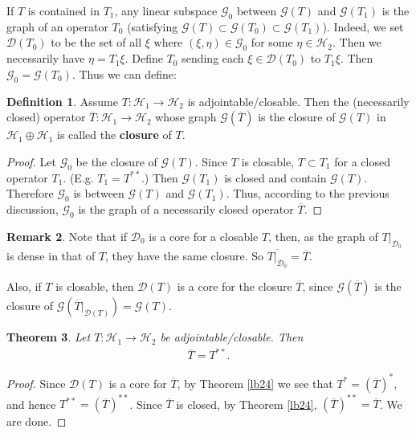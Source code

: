\documentclass[12pt,b5paper,notitlepage]{article}
\theoremstyle{definition}
\newtheorem{df}{Definition}[section]
\newtheorem{rem}[df]{Remark}
\theoremstyle{plain}
\newtheorem{thm}[df]{Theorem}
\newcommand{\mc}{\mathcal}
\newcommand{\ovl}{\overline}
\newcommand{\Dom}{\scr D}
\newcommand{\scr}{\mathscr}
\numberwithin{equation}{section}
\begin{document}
If $T$ is contained in  $T_1$, any linear subspace $\scr G_0$  between $\scr G(T)$ and $\scr G(T_1)$ is the graph of an operator $T_0$ (satisfying $\scr G(T)\subset\scr G(T_0)\subset \scr G(T_1)$). Indeed, we set $\Dom(T_0)$ to be the set of all $\xi$ where $(\xi,\eta)\in\scr G_0$ for some $\eta\in\mc H_2$. Then we necessarily have $\eta=T_1\xi$. Define $T_0$ sending each $\xi\in\Dom(T_0)$ to $T_1\xi$. Then $\scr G_0=\scr G(T_0)$. Thus we can define:

\begin{df}
Assume $T:\mc H_1\rightarrow\mc H_2$ is adjointable/closable. Then the (necessarily closed) operator $\ovl T:\mc H_1\rightarrow\mc H_2$ \index{T@$\ovl T=T^{**}$} whose graph $\scr G(\ovl T)$ is the closure of $\scr G(T)$ in $\mc H_1\oplus \mc H_1$ is called the \textbf{closure} of $T$.
\end{df} 

\begin{proof}
Let $\scr G_0$ be the closure of $\scr G(T)$. Since $T$ is closable, $T\subset T_1$ for a closed operator $T_1$. (E.g. $T_1=T^{**}$.) Then $\scr G(T_1)$ is closed and contain $\scr G(T)$. Therefore $\scr G_0$ is between $\scr G(T)$ and $\scr G(T_1)$. Thus, according to the previous discussion, $\scr G_0$ is the graph of a necessarily closed operator $\ovl T$.
\end{proof}


\begin{rem}
Note that if $\scr D_0$ is a core for a closable $T$, then, as the graph of $T|_{\scr D_0}$ is dense in that of $T$, they have the same closure. So $\ovl{T|_{\scr D_0}}=\ovl T$. 

Also, if $T$ is closable, then $\Dom(T)$ is a core for the closure $\ovl T$, since $\scr G(\ovl T)$ is the closure of $\scr G(\ovl T|_{\Dom(T)})=\scr G(T)$.
\end{rem}


\begin{thm}
Let $T:\mc H_1\rightarrow\mc H_2$ be adjointable/closable. Then
\begin{align*}
\ovl T=T^{**}.	
\end{align*}
\end{thm}

\begin{proof}
Since $\Dom(T)$ is a core for $\ovl T$, by Theorem \ref{lb24} we see that $T^*=(\ovl T)^*$, and hence $T^{**}=(\ovl T)^{**}$. Since $\ovl T$ is closed, by Theorem \ref{lb24}, $(\ovl T)^{**}=\ovl T$. We are done. 
\end{proof}
\end{document}
